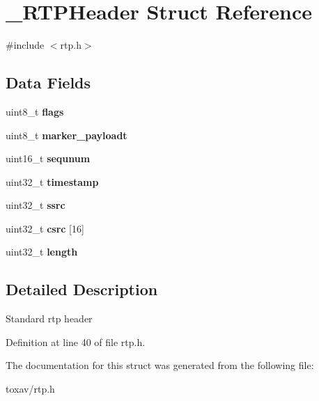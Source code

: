 \hypertarget{struct___r_t_p_header}{\section{\+\_\+\+R\+T\+P\+Header Struct Reference}
\label{struct___r_t_p_header}
}


{\ttfamily \#include $<$rtp.\+h$>$}

\subsection*{Data Fields}
\begin{DoxyCompactItemize}
\item 
\hypertarget{struct___r_t_p_header_aa2585d779da0ab21273a8d92de9a0ebe}{uint8\+\_\+t {\bfseries flags}}\label{struct___r_t_p_header_aa2585d779da0ab21273a8d92de9a0ebe}

\item 
\hypertarget{struct___r_t_p_header_a18075763f8af96670c357b0322a71d96}{uint8\+\_\+t {\bfseries marker\+\_\+payloadt}}\label{struct___r_t_p_header_a18075763f8af96670c357b0322a71d96}

\item 
\hypertarget{struct___r_t_p_header_afe208c7dec97b8f61e08094e61bf096e}{uint16\+\_\+t {\bfseries sequnum}}\label{struct___r_t_p_header_afe208c7dec97b8f61e08094e61bf096e}

\item 
\hypertarget{struct___r_t_p_header_ab20b0c7772544cf5d318507f34231fbe}{uint32\+\_\+t {\bfseries timestamp}}\label{struct___r_t_p_header_ab20b0c7772544cf5d318507f34231fbe}

\item 
\hypertarget{struct___r_t_p_header_a7728cdfcf33cc14c0d7ba2dcdcbcdf2e}{uint32\+\_\+t {\bfseries ssrc}}\label{struct___r_t_p_header_a7728cdfcf33cc14c0d7ba2dcdcbcdf2e}

\item 
\hypertarget{struct___r_t_p_header_a67d30a003e4e6edc3e5a6304d3a3a301}{uint32\+\_\+t {\bfseries csrc} \mbox{[}16\mbox{]}}\label{struct___r_t_p_header_a67d30a003e4e6edc3e5a6304d3a3a301}

\item 
\hypertarget{struct___r_t_p_header_aebb70c2aab3407a9f05334c47131a43b}{uint32\+\_\+t {\bfseries length}}\label{struct___r_t_p_header_aebb70c2aab3407a9f05334c47131a43b}

\end{DoxyCompactItemize}


\subsection{Detailed Description}
Standard rtp header 

Definition at line 40 of file rtp.\+h.



The documentation for this struct was generated from the following file\+:\begin{DoxyCompactItemize}
\item 
toxav/rtp.\+h\end{DoxyCompactItemize}
